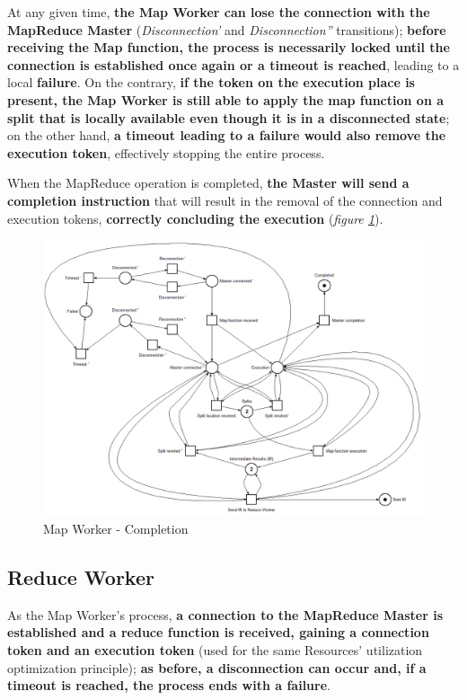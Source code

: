 \vspace{2mm}

At any given time, \textbf{the Map Worker can lose the connection with the MapReduce Master} (\textit{Disconnection'} and \textit{Disconnection''} transitions); \textbf{before receiving the Map function, the process is necessarily locked until the connection is established once again or a timeout is reached}, leading to a local \textbf{failure}. On the contrary, \textbf{if the token on the execution place is present, the Map Worker is still able to apply the map function on a split that is locally available even though it is in a disconnected state}; on the other hand, \textbf{a timeout leading to a failure would also remove the execution token}, effectively stopping the entire process.

When the MapReduce operation is completed, \textbf{the Master will send a completion instruction} that will result in the removal of the connection and execution tokens, \textbf{correctly concluding the execution} (\textit{figure \ref{fig:map_worker_petri_net_4}}).

\begin{figure}[!ht]
    \centering
    \includegraphics[scale=0.45]{document/chapters/chapter_5/images/map_worker_petri_net_4.png}
    \caption{Map Worker - Completion}
    \label{fig:map_worker_petri_net_4}
\end{figure}

\subsection{Reduce Worker}
As the Map Worker's process, \textbf{a connection to the MapReduce Master is established and a reduce function is received, gaining a connection token and an execution token} (used for the same Resources' utilization optimization principle); \textbf{as before, a disconnection can occur and, if a timeout is reached, the process ends with a failure}.

